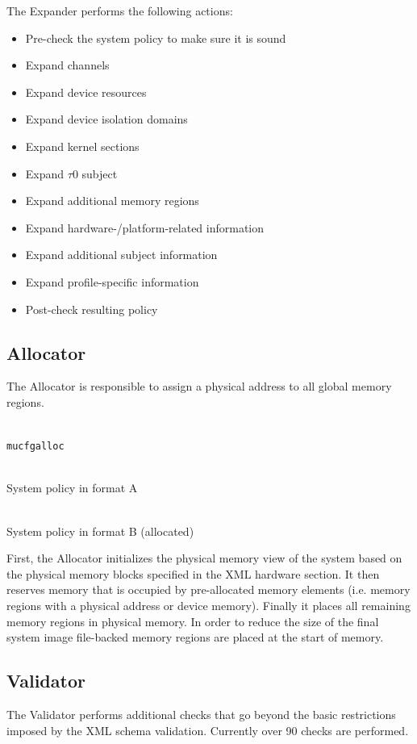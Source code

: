 \documentclass[a4paper,twoside,titlepage]{article}
\begin{document}
The Expander performs the following actions:
\begin{itemize}
	\item Pre-check the system policy to make sure it is sound
	\item Expand channels
	\item Expand device resources
	\item Expand device isolation domains
	\item Expand kernel sections
	\item Expand $\tau$0 subject
	\item Expand additional memory regions
	\item Expand hardware-/platform-related information
	\item Expand additional subject information
	\item Expand profile-specific information
	\item Post-check resulting policy
\end{itemize}

\subsection{Allocator}
\label{sec:tools-allocator}
The Allocator is responsible to assign a physical address to all global memory
regions.

\begin{description} \itemsep1pt \parskip0pt
	\item[Name] \hfill \\
		\texttt{mucfgalloc}
	\item[Input] \hfill \\
		System policy in format A
	\item[Output] \hfill \\
		System policy in format B (allocated)
\end{description}

First, the Allocator initializes the physical memory view of the system based
on the physical memory blocks specified in the XML hardware section. It then
reserves memory that is occupied by pre-allocated memory elements (i.e. memory
regions with a physical address or device memory).  Finally it places all
remaining memory regions in physical memory.  In order to reduce the size of
the final system image file-backed memory regions are placed at the start of
memory.

\subsection{Validator}
\label{sec:tools-validator}
The Validator performs additional checks that go beyond the basic restrictions
imposed by the XML schema validation. Currently over 90 checks are performed.
\end{document}
